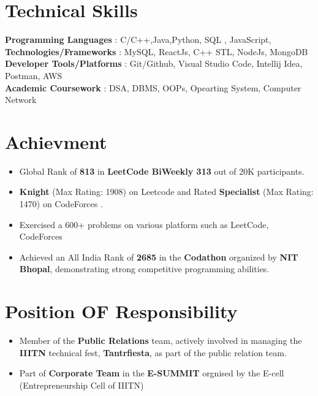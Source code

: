 \documentclass[letterpaper,11pt]{article}
\newcommand{\resumeItem}[1]{
  \item\small{
    {#1 \vspace{-2pt}}
  }
}
\newcommand{\resumeItemListStart}{\begin{itemize}}
\newcommand{\resumeItemListEnd}{\end{itemize}\vspace{-5pt}}
\begin{document}
%
\section{Technical Skills}
 \begin{itemize}[leftmargin=0.15in, label={}]
    \small{\item{
     \textbf{Programming Languages }{: C/C++,Java,Python, SQL , JavaScript,} \\
     \textbf{Technologies/Frameworks }{: MySQL,  ReactJs, C++ STL, NodeJs, MongoDB } \\
     \textbf{Developer Tools/Platforms }{: Git/Github, Visual Studio Code, Intellij Idea, Postman, AWS } \\
     \textbf{Academic Coursework }{: DSA, DBMS, OOPs, Opearting System, Computer Network }
    }}
 
 \end{itemize}
 


\section{Achievment}

 \resumeItemListStart
            \resumeItem{  Global Rank of  \textbf{813 }in\textbf{ LeetCode BiWeekly 313} out of 20K participants.}
            \resumeItem{ \textbf{ Knight} (Max Rating: 1908) on Leetcode and Rated \textbf{Specialist} (Max Rating: 1470) on CodeForces .}
            \resumeItem{Exercised a 600+ problems on various platform such as LeetCode, CodeForces}
            \resumeItem{Achieved an All India Rank of \textbf{2685} in the \textbf{Codathon} organized by \textbf{NIT Bhopal}, demonstrating strong competitive programming abilities.  }
          \resumeItemListEnd

\section{Position OF Responsibility}
 \resumeItemListStart
            \resumeItem{ Member of the \textbf{Public Relations} team, actively involved in managing the \textbf{IIITN} technical fest, \textbf{Tantrfiesta}, as part of the public relation team. }

             \resumeItem{ Part of \textbf{Corporate Team} in the\textbf{ E-SUMMIT} orgnised by the E-cell (Entrepreneurship Cell  of IIITN)}
      
          \resumeItemListEnd

          
 

\end{document}
